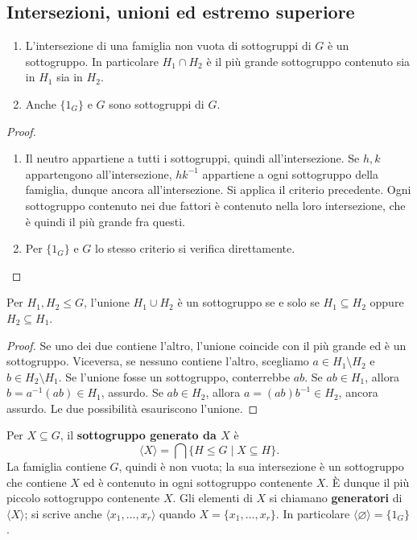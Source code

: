 \subsection{Intersezioni, unioni ed estremo superiore}
\begin{proposizione}\label{prop:intersezione-sottogruppi}
\begin{enumerate}[label=\arabic*.]
\item L'intersezione di una famiglia non vuota di sottogruppi di $G$ è un sottogruppo. In particolare $H_1\cap H_2$ è il più grande sottogruppo contenuto sia in $H_1$ sia in $H_2$.
\item Anche $\{1_G\}$ e $G$ sono sottogruppi di $G$.
\end{enumerate}
\end{proposizione}
\begin{proof}
\begin{enumerate}[label=\arabic*.]
\item Il neutro appartiene a tutti i sottogruppi, quindi all'intersezione. Se $h,k$ appartengono all'intersezione, $hk^{-1}$ appartiene a ogni sottogruppo della famiglia, dunque ancora all'intersezione. Si applica il criterio precedente. Ogni sottogruppo contenuto nei due fattori è contenuto nella loro intersezione, che è quindi il più grande fra questi.
\item Per $\{1_G\}$ e $G$ lo stesso criterio si verifica direttamente.
\end{enumerate}
\end{proof}

\begin{proposizione}\label{prop:unione-sottogruppi}
Per $H_1,H_2\le G$, l'unione $H_1\cup H_2$ è un sottogruppo se e solo se $H_1\subseteq H_2$ oppure $H_2\subseteq H_1$.
\end{proposizione}
\begin{proof}
Se uno dei due contiene l'altro, l'unione coincide con il più grande ed è un sottogruppo. Viceversa, se nessuno contiene l'altro, scegliamo $a\in H_1\setminus H_2$ e $b\in H_2\setminus H_1$. Se l'unione fosse un sottogruppo, conterrebbe $ab$. Se $ab\in H_1$, allora $b=a^{-1}(ab)\in H_1$, assurdo. Se $ab\in H_2$, allora $a=(ab)b^{-1}\in H_2$, ancora assurdo. Le due possibilità esauriscono l'unione.
\end{proof}

\begin{definizione}
Per $X\subseteq G$, il \textbf{sottogruppo generato da $X$} è
\[
\langle X\rangle=\bigcap\{H\le G\mid X\subseteq H\}.
\]
La famiglia contiene $G$, quindi è non vuota; la sua intersezione è un sottogruppo che contiene $X$ ed è contenuto in ogni sottogruppo contenente $X$. È dunque il più piccolo sottogruppo contenente $X$. Gli elementi di $X$ si chiamano \textbf{generatori} di $\langle X\rangle$; si scrive anche $\langle x_1,\ldots,x_r\rangle$ quando $X=\{x_1,\ldots,x_r\}$. In particolare $\langle\varnothing\rangle=\{1_G\}$.
\end{definizione}

